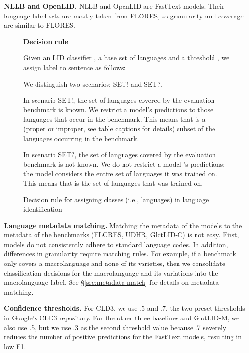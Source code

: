 \documentclass[11pt]{article}
\newcommand{\basequ}{SET?\xspace}
\newcommand{\baseex}{SET!\xspace}
\def\modelname{\mbox{GlotLID-M}\xspace}
\def\corpusname{\mbox{GlotLID-C}\xspace}
\def\macrolanguage{macrolanguage\xspace}
\def\flores{FLORES\xspace}
\def\udhr{UDHR\xspace}
\def\edin{OpenLID\xspace}
\def\nllb{NLLB\xspace}
\def\figlabel#1{\label{fig:#1}\label{p:#1}}
\def\secref#1{\S\ref{sec:#1}}
\begin{document}
\textbf{\nllb and \edin.} \nllb and \edin are
FastText
models. Their language label sets are mostly taken from
\flores, so granularity and coverage are similar to \flores.



\begin{figure*}
\centering
\begin{minipage}[t]{\textwidth}
\small
\textbf{Decision rule}

\smallskip

Given an LID classifier , a base set  of languages and
a threshold , we assign label  to
sentence  as follows:

           We distinguish two scenarios: \baseex and \basequ.

\smallskip

In scenario \baseex, the set of languages covered
      by the evaluation benchmark is
      known. We restrict a model's predictions to those languages that
      occur in the benchmark. This means that  is a
      (proper or improper, see table captions for details)
      subset of the languages occurring in the benchmark.

\smallskip

In scenario \basequ, the set of languages covered by the
      evaluation benchmark is not known. We do not restrict
      a model 's
      predictions: the model considers the entire set of
      languages it was trained on. This means that  is
      the set of languages that  was trained on.

\smallskip


\end{minipage}
\caption{\figlabel{decisionrule}Decision rule for assigning classes (i.e.,
      languages) in language identification}
\end{figure*}

\textbf{Language metadata matching.}
Matching the metadata
of the models to the metadata of the  benchmarks
(\flores, \udhr, \corpusname) is  not easy.
First, models do not consistently adhere to standard language
codes.
In addition, differences in granularity require
matching rules. For example, if a benchmark only covers
a \macrolanguage and none of its varieties, then
we consolidate classification decisions for the \macrolanguage and
its variations into the \macrolanguage label.
See \secref{metadata-match} for details on
metadata matching.

\textbf{Confidence thresholds.} For CLD3, we use
.5 and .7,
the two preset thresholds in Google's CLD3 repository.
For the other three baselines and \modelname, we also use
.5, but we use .3 as the second threshold value because .7
severely reduces the number of positive predictions for the
FastText models, resulting in low F1.
\end{document}
